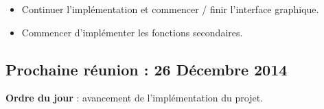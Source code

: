 \documentclass[12pt,a4paper]{article}
\begin{document}
\begin{itemize}[label = $\circledcirc$]
	\item Continuer l'implémentation et commencer / finir l'interface graphique.
	\item Commencer d'implémenter les fonctions secondaires.
\end{itemize}

\subsection*{Prochaine réunion : 26 Décembre 2014}

\textbf{Ordre du jour} : avancement de l'implémentation du projet.\\
\end{document}
